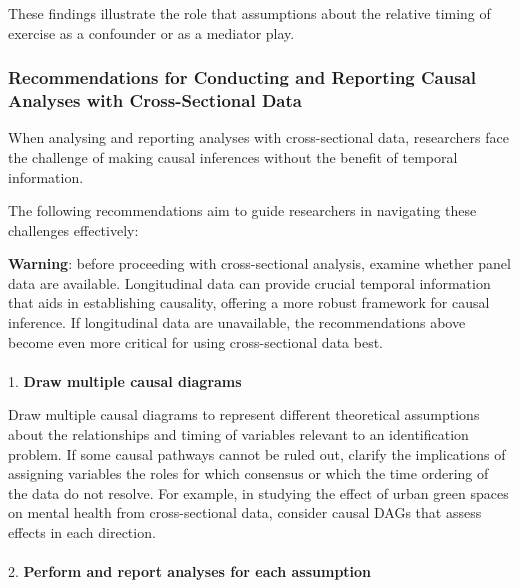 \documentclass[
  singlecolumn]{article}
\makeatletter
\let\oldparagraph\paragraph
\renewcommand{\paragraph}{
    \@ifstar
      \xxxParagraphStar
      \xxxParagraphNoStar
  }
\newcommand{\xxxParagraphStar}[1]{\oldparagraph*{#1}\mbox{}}
\newcommand{\xxxParagraphNoStar}[1]{\oldparagraph{#1}\mbox{}}
\makeatother
\begin{document}
These findings illustrate the role that assumptions about the relative
timing of exercise as a confounder or as a mediator play.

\subsubsection{Recommendations for Conducting and Reporting Causal
Analyses with Cross-Sectional
Data}\label{recommendations-for-conducting-and-reporting-causal-analyses-with-cross-sectional-data}

When analysing and reporting analyses with cross-sectional data,
researchers face the challenge of making causal inferences without the
benefit of temporal information.

The following recommendations aim to guide researchers in navigating
these challenges effectively:

\textbf{Warning}: before proceeding with cross-sectional analysis,
examine whether panel data are available. Longitudinal data can provide
crucial temporal information that aids in establishing causality,
offering a more robust framework for causal inference. If longitudinal
data are unavailable, the recommendations above become even more
critical for using cross-sectional data best.

\paragraph{\texorpdfstring{1. \textbf{Draw multiple causal
diagrams}}{1. Draw multiple causal diagrams}}\label{draw-multiple-causal-diagrams}

Draw multiple causal diagrams to represent different theoretical
assumptions about the relationships and timing of variables relevant to
an identification problem. If some causal pathways cannot be ruled out,
clarify the implications of assigning variables the roles for which
consensus or which the time ordering of the data do not resolve. For
example, in studying the effect of urban green spaces on mental health
from cross-sectional data, consider causal DAGs that assess effects in
each direction.

\paragraph{\texorpdfstring{2. \textbf{Perform and report analyses for
each
assumption}}{2. Perform and report analyses for each assumption}}\label{perform-and-report-analyses-for-each-assumption}
\end{document}
